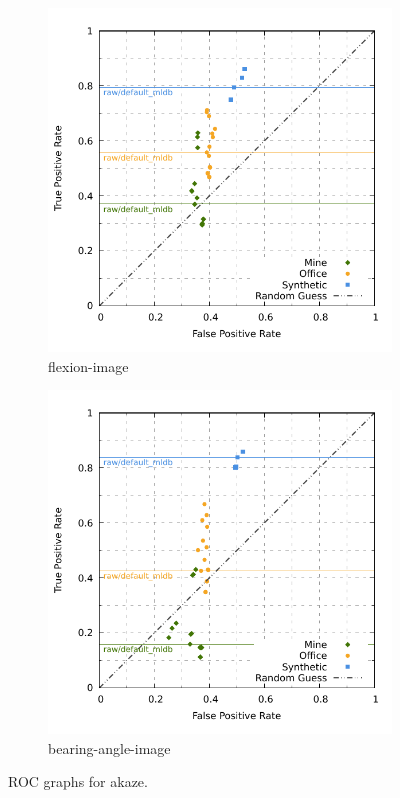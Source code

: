 \begin{figure}[H]
\begin{subfigure}[t]{0.45\linewidth}
    \includegraphics[width=\linewidth]{chapter06/results/AKAZE/flexion/roc.pdf}%
    \caption{\gls{flexion-image}}
\end{subfigure}\quad
\begin{subfigure}[t]{0.45\linewidth}
    \includegraphics[width=\linewidth]{chapter06/results/AKAZE/bearing/roc.pdf}
    \caption{\gls{bearing-angle-image}}
\end{subfigure}
    \caption{\acrshort{ROC} graphs for \acrshort{akaze}.}\label{fig:roc_akaze}
\end{figure}
